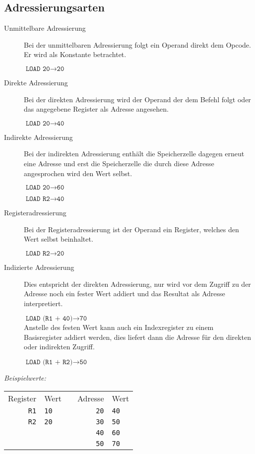 \subsection{Adressierungsarten}
\begin{description}
 \item[Unmittelbare Adressierung] 
 Bei der unmittelbaren Adressierung folgt ein Operand direkt dem Opcode. Er wird als Konstante betrachtet. \par
 $\texttt{LOAD 20}\rightarrow\texttt{20}$
 
 \item[Direkte Adressierung]
 Bei der direkten Adressierung wird der Operand der dem Befehl folgt oder das angegebene Register als
 Adresse angesehen. \par
 $\texttt{LOAD 20}\rightarrow\texttt{40}$
 
 \item[Indirekte Adressierung]
 Bei der indirekten Adressierung enthält die Speicherzelle dagegen erneut eine Adresse und erst die
 Speicherzelle die durch diese Adresse angesprochen wird den Wert selbst. \par
 $\texttt{LOAD 20}\rightarrow\texttt{60}$ \par
 $\texttt{LOAD R2}\rightarrow\texttt{40}$
 
 \item[Registeradressierung]
 Bei der Registeradressierung ist der Operand ein Register, welches den Wert selbst beinhaltet. \par
 $\texttt{LOAD R2}\rightarrow\texttt{20}$

 \item[Indizierte Adressierung]
 Dies entspricht der direkten Adressierung, nur wird vor dem Zugriff zu der Adresse noch ein fester Wert
 addiert und das Resultat als Adresse interpretiert. \par
 $\texttt{LOAD (R1 + 40)}\rightarrow\texttt{70}$ \\
 Anstelle des festen Wert kann auch ein Indexregister zu einem Basisregister addiert werden, dies liefert
 dann die Adresse für den direkten oder indirekten Zugriff. \par
 $\texttt{LOAD (R1 + R2)}\rightarrow\texttt{50}$
\end{description}
\emph{Beispielwerte:}
\begin{center}
\begin{tabular}{|r|l|c|r|l|}\cline{1-2}\cline{4-5}
Register & Wert & & Adresse & Wert\\\cline{1-2}\cline{4-5}
\texttt{R1} & \texttt{10} & & \texttt{20} & \texttt{40}\\\cline{1-2}\cline{4-5}
\texttt{R2} & \texttt{20} & & \texttt{30} & \texttt{50}\\\cline{1-2}\cline{4-5}
            &             & & \texttt{40} & \texttt{60}\\\cline{1-2}\cline{4-5}
            &             & & \texttt{50} & \texttt{70}\\\cline{1-2}\cline{4-5}
\end{tabular}
\end{center}



